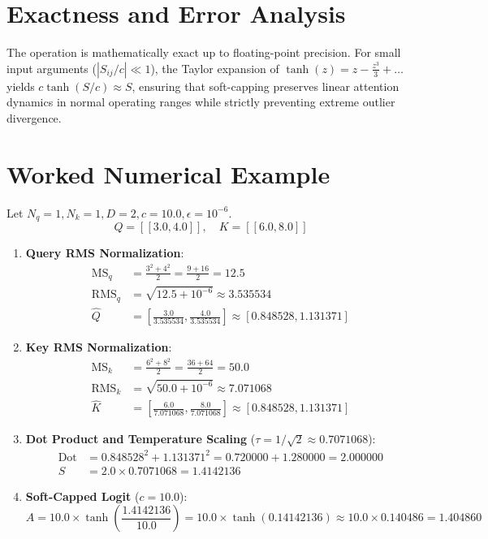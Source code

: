 \documentclass[11pt,a4paper]{article}
\theoremstyle{definition}
\begin{document}
\section{Exactness and Error Analysis}

The operation is mathematically exact up to floating-point precision. For small input arguments ($|S_{ij}/c| \ll 1$), the Taylor expansion of $\tanh(z) = z - \frac{z^3}{3} + \dots$ yields $c \tanh(S/c) \approx S$, ensuring that soft-capping preserves linear attention dynamics in normal operating ranges while strictly preventing extreme outlier divergence.

\section{Worked Numerical Example}

Let $N_q = 1, N_k = 1, D = 2, c = 10.0, \epsilon = 10^{-6}$.
\begin{equation}
Q = [[3.0, 4.0]], \quad K = [[6.0, 8.0]]
\end{equation}

\begin{enumerate}
    \item \textbf{Query RMS Normalization}:
    \begin{align}
    \text{MS}_q &= \frac{3^2 + 4^2}{2} = \frac{9 + 16}{2} = 12.5 \\
    \text{RMS}_q &= \sqrt{12.5 + 10^{-6}} \approx 3.535534 \\
    \hat{Q} &= \left[ \frac{3.0}{3.535534}, \frac{4.0}{3.535534} \right] \approx [0.848528, 1.131371]
    \end{align}
    \item \textbf{Key RMS Normalization}:
    \begin{align}
    \text{MS}_k &= \frac{6^2 + 8^2}{2} = \frac{36 + 64}{2} = 50.0 \\
    \text{RMS}_k &= \sqrt{50.0 + 10^{-6}} \approx 7.071068 \\
    \hat{K} &= \left[ \frac{6.0}{7.071068}, \frac{8.0}{7.071068} \right] \approx [0.848528, 1.131371]
    \end{align}
    \item \textbf{Dot Product and Temperature Scaling} ($\tau = 1/\sqrt{2} \approx 0.7071068$):
    \begin{align}
    \text{Dot} &= 0.848528^2 + 1.131371^2 = 0.720000 + 1.280000 = 2.000000 \\
    S &= 2.0 \times 0.7071068 = 1.4142136
    \end{align}
    \item \textbf{Soft-Capped Logit} ($c = 10.0$):
    \begin{equation}
    A = 10.0 \times \tanh\left( \frac{1.4142136}{10.0} \right) = 10.0 \times \tanh(0.14142136) \approx 10.0 \times 0.140486 = 1.404860
    \end{equation}
\end{enumerate}
\end{document}
